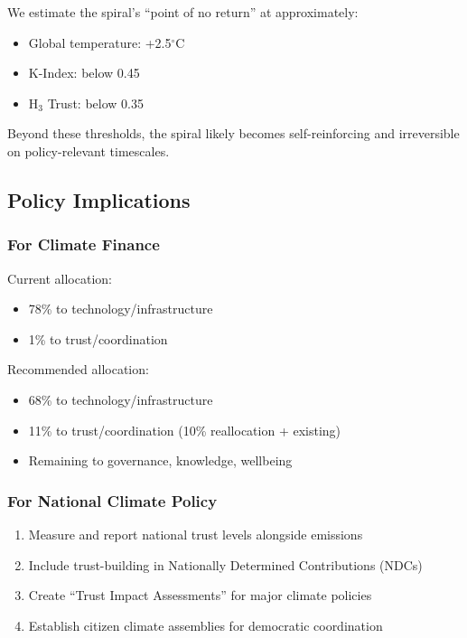 \documentclass[12pt,a4paper]{article}
\begin{document}
We estimate the spiral's ``point of no return'' at approximately:
\begin{itemize}
    \item Global temperature: +2.5$^\circ$C
    \item K-Index: below 0.45
    \item H$_3$ Trust: below 0.35
\end{itemize}

Beyond these thresholds, the spiral likely becomes self-reinforcing and irreversible on policy-relevant timescales.

\subsection{Policy Implications}

\subsubsection{For Climate Finance}

Current allocation:
\begin{itemize}
    \item 78\% to technology/infrastructure
    \item 1\% to trust/coordination
\end{itemize}

Recommended allocation:
\begin{itemize}
    \item 68\% to technology/infrastructure
    \item 11\% to trust/coordination (10\% reallocation + existing)
    \item Remaining to governance, knowledge, wellbeing
\end{itemize}

\subsubsection{For National Climate Policy}

\begin{enumerate}
    \item Measure and report national trust levels alongside emissions
    \item Include trust-building in Nationally Determined Contributions (NDCs)
    \item Create ``Trust Impact Assessments'' for major climate policies
    \item Establish citizen climate assemblies for democratic coordination
\end{enumerate}
\end{document}

